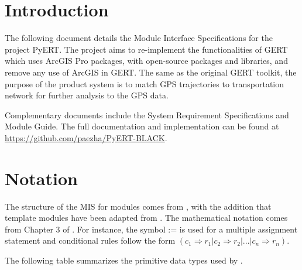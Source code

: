 \documentclass[12pt, titlepage]{article}
\begin{document}
\newpage

\newpage

\tableofcontents

\newpage


\section{Introduction}

The following document details the Module Interface Specifications for the project PyERT. The project aims to re-implement the functionalities of GERT~\citep{DALUMPINES2018121} which uses ArcGIS Pro packages, with
open-source packages and libraries, and remove any use of ArcGIS in GERT. The same as the original GERT toolkit, the purpose of the product system is to match GPS trajectories to transportation network for further analysis to the GPS data. 

Complementary documents include the System Requirement Specifications
and Module Guide.  The full documentation and implementation can be
found at \url{https://github.com/paezha/PyERT-BLACK}.

\section{Notation}


The structure of the MIS for modules comes from \citet{HoffmanAndStrooper1995},
with the addition that template modules have been adapted from
\cite{GhezziEtAl2003}.  The mathematical notation comes from Chapter 3 of
\citet{HoffmanAndStrooper1995}.  For instance, the symbol := is used for a
multiple assignment statement and conditional rules follow the form $(c_1
\Rightarrow r_1 | c_2 \Rightarrow r_2 | ... | c_n \Rightarrow r_n )$.

The following table summarizes the primitive data types used by \progname. 
\end{document}
